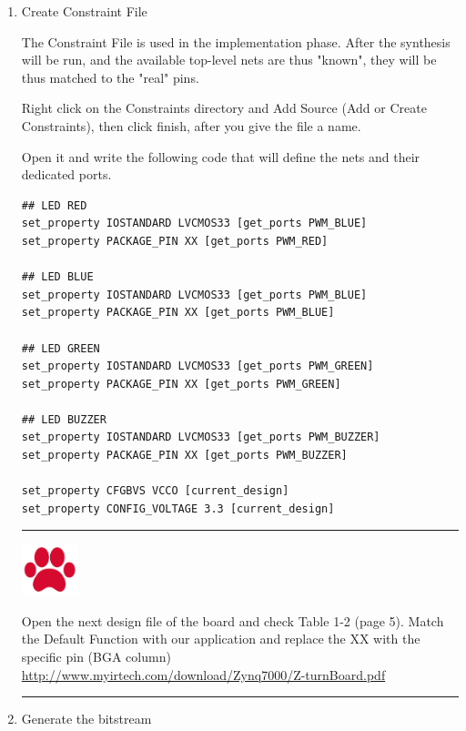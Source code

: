 \documentclass[letterpaper, portrait, margin=0.8in]{article}
\begin{document}
\begin{enumerate}
 \item Create Constraint File
 
The Constraint File is used in the implementation phase. After the synthesis will be run, and the available top-level nets are thus "known", they will be thus matched to the "real" pins.
  
Right click on the Constraints directory and Add Source (Add or Create Constraints), then click finish, after you give the file a name.

Open it and write the following code that will define the nets and their dedicated ports.

\begin{verbatim}
## LED RED
set_property IOSTANDARD LVCMOS33 [get_ports PWM_BLUE]
set_property PACKAGE_PIN XX [get_ports PWM_RED]

## LED BLUE
set_property IOSTANDARD LVCMOS33 [get_ports PWM_BLUE]
set_property PACKAGE_PIN XX [get_ports PWM_BLUE]

## LED GREEN
set_property IOSTANDARD LVCMOS33 [get_ports PWM_GREEN]
set_property PACKAGE_PIN XX [get_ports PWM_GREEN]

## LED BUZZER
set_property IOSTANDARD LVCMOS33 [get_ports PWM_BUZZER]
set_property PACKAGE_PIN XX [get_ports PWM_BUZZER]

set_property CFGBVS VCCO [current_design]
set_property CONFIG_VOLTAGE 3.3 [current_design]

\end{verbatim}

\noindent\rule{16.5cm}{1pt}

\noindent\begin{minipage}{.1\textwidth}
  \centering
  \includegraphics[height=1.5cm]{img/icon.png}
\end{minipage}
\begin{minipage}{.8\textwidth}
Open the next design file of the board and check Table 1-2 (page 5). Match the Default Function with our application and replace the XX with the specific pin (BGA column)
\url{http://www.myirtech.com/download/Zynq7000/Z-turnBoard.pdf}
\end{minipage}%

\noindent\rule{16.5cm}{1pt}


\item Generate the bitstream



\end{enumerate}
\end{document}
